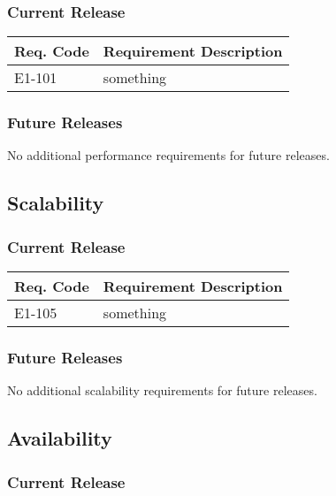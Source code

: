 \documentclass[12pt]{article}
\begin{document}
\subsubsection{Current Release}

\begin{table}[!h]
	\begin{tabular}{| l | l |}
		\hline
		\textbf{Req. Code} & \textbf{Requirement Description}\\
		\hline
		E1-101	& something\\
		\hline
	\end{tabular}
	\label{tab:PerformanceRequirements}
\end{table}

\subsubsection{Future Releases}
No additional performance requirements for future releases.


\subsection{Scalability}

\subsubsection{Current Release}

\begin{table}[!h]
	\begin{tabular}{| l | l |}
		\hline
		\textbf{Req. Code} & \textbf{Requirement Description}\\
		\hline
		E1-105	& something\\
		\hline
	\end{tabular}
	\label{tab:ScalabilityRequirements}
\end{table}

\subsubsection{Future Releases}
No additional scalability requirements for future releases.


\subsection{Availability}

\subsubsection{Current Release}
\end{document}
